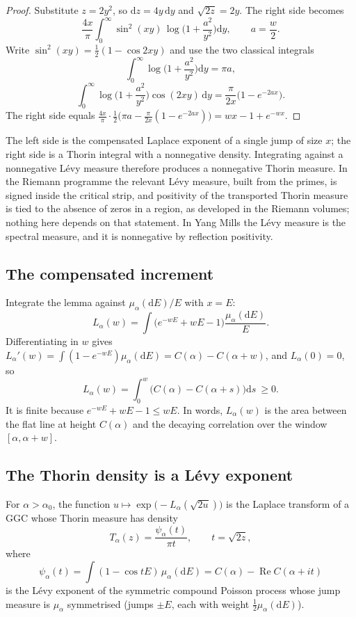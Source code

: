 \begin{proof}
Substitute $z=2y^2$, so $\mathrm dz=4y\,\mathrm dy$ and $\sqrt{2z}=2y$. The right side becomes
\[
\frac{4x}{\pi}\int_0^\infty\sin^2(xy)\,\log\Big(1+\frac{a^2}{y^2}\Big)\mathrm dy,\qquad a=\frac w2 .
\]
Write $\sin^2(xy)=\frac12(1-\cos2xy)$ and use the two classical integrals
\[
\int_0^\infty\log\Big(1+\frac{a^2}{y^2}\Big)\mathrm dy=\pi a,
\]
\[
\int_0^\infty\log\Big(1+\frac{a^2}{y^2}\Big)\cos(2xy)\,\mathrm dy=\frac{\pi}{2x}\big(1-e^{-2ax}\big).
\]
The right side equals $\frac{4x}{\pi}\cdot\frac12\big(\pi a-\frac{\pi}{2x}(1-e^{-2ax})\big)=wx-1+e^{-wx}$.
\end{proof}

The left side is the compensated Laplace exponent of a single jump of size $x$; the right side is a Thorin integral with a nonnegative density. Integrating against a nonnegative L\'evy measure therefore produces a nonnegative Thorin measure. In the Riemann programme the relevant L\'evy measure, built from the primes, is signed inside the critical strip, and positivity of the transported Thorin measure is tied to the absence of zeros in a region, as developed in the Riemann volumes\cite{PS26a}; nothing here depends on that statement. In Yang Mills the L\'evy measure is the spectral measure, and it is nonnegative by reflection positivity.

\subsection{The compensated increment}

Integrate the lemma against $\mu_\alpha(\mathrm dE)/E$ with $x=E$:
\[
L_\alpha(w)=\int\big(e^{-wE}+wE-1\big)\frac{\mu_\alpha(\mathrm dE)}{E}.
\]
Differentiating in $w$ gives $L_\alpha'(w)=\int(1-e^{-wE})\mu_\alpha(\mathrm dE)=C(\alpha)-C(\alpha+w)$, and $L_\alpha(0)=0$, so
\[
L_\alpha(w)=\int_0^w\big(C(\alpha)-C(\alpha+s)\big)\mathrm ds\ \ge0 .
\]
It is finite because $e^{-wE}+wE-1\le wE$. In words, $L_\alpha(w)$ is the area between the flat line at height $C(\alpha)$ and the decaying correlation over the window $[\alpha,\alpha+w]$.

\subsection{The Thorin density is a L\'evy exponent}

\begin{theorem}\label{thm:thorinB}
For $\alpha>\alpha_0$, the function $u\mapsto\exp\big(-L_\alpha(\sqrt{2u})\big)$ is the Laplace transform of a GGC whose Thorin measure has density
\[
T_\alpha(z)=\frac{\psi_\alpha(t)}{\pi t},\qquad t=\sqrt{2z},
\]
where
\[
\psi_\alpha(t)=\int(1-\cos tE)\,\mu_\alpha(\mathrm dE)=C(\alpha)-\operatorname{Re}C(\alpha+it)
\]
is the L\'evy exponent of the symmetric compound Poisson process whose jump measure is $\mu_\alpha$ symmetrised (jumps $\pm E$, each with weight $\frac12\mu_\alpha(\mathrm dE)$).
\end{theorem}

